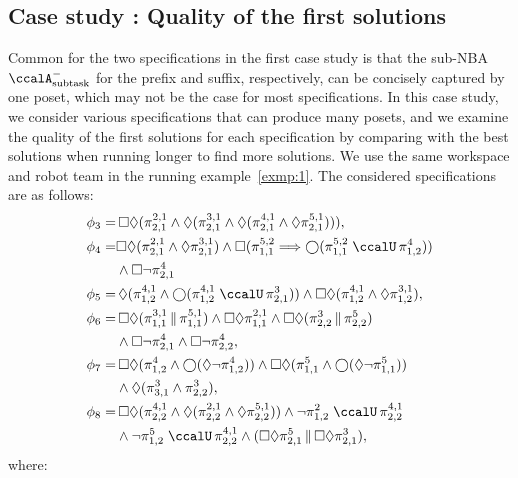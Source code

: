 \documentclass[Afour,sageh,times]{sagej}
\newcommand{\auto}[1]{\ccalA_{\textup{#1}}}
\newcommand{\simplies}{\DOTSB\Longrightarrow}
\renewcommand{\ap}[3]{\mathcal{\pi}_{{#1},{#2}}^{#3}}
\newcommand{\RNum}[1]{\uppercase\expandafter{\romannumeral #1\relax}}
\begin{document}
{{\subsection{Case study \RNum{2}: Quality of the first solutions} Common for the two specifications in the first case study is that the sub-NBA $\auto{subtask}^-$ for the prefix and suffix, respectively,  can be concisely captured by one poset, which may not be the case for most specifications. In this case study, we consider various specifications that can produce many posets, and we examine the quality of the first solutions for each specification by comparing with the best solutions when running longer to find  more solutions. We use the same workspace and robot team in the running example~\ref{exmp:1}. The considered specifications are as follows:
\begingroup
\allowdisplaybreaks
\begin{align*}
  \phi_3  = & \, \square \lozenge (\ap{2}{1}{2,1} \wedge \lozenge (\ap{2}{1}{3,1} \wedge \lozenge (\ap{2}{1}{4,1} \wedge \lozenge \ap{2}{1}{5,1}  )   )  ), \\
  \phi_4 = & \square \lozenge (\ap{2}{1}{2,1} \wedge \lozenge \ap{2}{1}{3,1}) \wedge \square (\ap{1}{1}{5,2} \simplies \bigcirc (\ap{1}{1}{5,2} \;\ccalU \, \ap{1}{2}{4})) \\
  &  \wedge \square \neg \ap{2}{1}{4}\\
  \phi_5  = & \, \lozenge (\ap{1}{2}{4,1} \wedge \bigcirc (\ap{1}{2}{4,1} \;\ccalU \, \ap{2}{1}{3})) \wedge \square \lozenge ( \ap{1}{2}{4,1} \wedge \lozenge \ap{1}{2}{3,1}), \\
  \phi_6  = & \,  \square \lozenge (\ap{1}{1}{3,1} \,\|\, \ap{1}{1}{5,1}) \wedge \square \lozenge \ap{1}{1}{2,1}  \wedge \square \lozenge (\ap{2}{2}{3} \,\|\, \ap{2}{2}{5})  \\
   & \wedge \square \neg \ap{2}{1}{4} \wedge \square \neg \ap{2}{2}{4}, \\
  \phi_7  = & \,  \square \lozenge (\ap{1}{2}{4} \wedge \bigcirc (\lozenge \neg \ap{1}{2}{4})) \wedge  \square \lozenge (\ap{1}{1}{5} \wedge \bigcirc (\lozenge \neg \ap{1}{1}{5} )) \\
  & \wedge  \lozenge  (\ap{3}{1}{3} \wedge \ap{2}{2}{3}), \\
  \phi_8 = & \, \square \lozenge  (\ap{2}{2}{4,1} \wedge \lozenge (\ap{2}{2}{2,1} \wedge \lozenge \ap{2}{2}{5,1}))  \wedge  \neg \ap{1}{2}{2} \;\ccalU \, \ap{2}{2}{4,1} \\
  & \wedge \neg \ap{1}{2}{5} \; \ccalU \, \ap{2}{2}{4,1} \wedge (\square \lozenge \ap{2}{1}{5}\, \| \,  \square \lozenge \ap{2}{1}{3}),
\end{align*}
\endgroup
where:

}}
\end{document}
